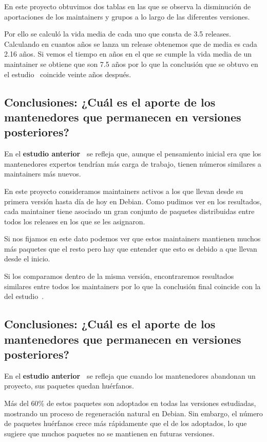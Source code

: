 \documentclass[a4paper, 12pt]{book}
\begin{document}
En este proyecto obtuvimos dos tablas en las que se observa la disminución de aportaciones de los maintainers y grupos a lo largo de las diferentes versiones.

Por ello se calculó la vida media de cada uno que consta de 3.5 releases. Calculando en cuantos años se lanza un release obtenemos que de media es cada 2.16 años. Si vemos el tiempo en años en el que se cumple la vida media de un maintainer se obtiene que son 7.5 años por lo que la conclusión que se obtuvo en el estudio~\cite{robles05:_debian} coincide veinte años después.

\subsection{Conclusiones: ¿Cuál es el aporte de los mantenedores que permanecen en versiones posteriores?}
\label{subsec:conclusion_4}

En el \textbf{estudio anterior~\cite{robles05:_debian}} se refleja que, aunque el pensamiento inicial era que los mantenedores expertos tendrían más carga de trabajo, tienen números similares a maintainers más nuevos.

En este proyecto consideramos maintainers activos a los que llevan desde su primera versión hasta día de hoy en Debian. Como pudimos ver en los resultados, cada maintainer tiene asociado un gran conjunto de paquetes distribuidas entre todos los releases en los que se les asignaron.

Si nos fijamos en este dato podemos ver que estos maintainers mantienen muchos más paquetes que el resto pero hay que entender que esto es debido a que llevan desde el inicio.

Si los comparamos dentro de la misma versión, encontraremos resultados similares entre todos los maintainers por lo que la conclusión final coincide con la del estudio~\cite{robles05:_debian}. 

\subsection{Conclusiones: ¿Cuál es el aporte de los mantenedores que permanecen en versiones posteriores?}
\label{subsec:conclusion_5}

En el \textbf{estudio anterior~\cite{robles05:_debian}} se refleja que cuando los mantenedores abandonan un proyecto, sus paquetes quedan huérfanos. 

Más del 60\% de estos paquetes son adoptados en todas las versiones estudiadas, mostrando un proceso de regeneración natural en Debian. Sin embargo, el número de paquetes huérfanos crece más rápidamente que el de los adoptados, lo que sugiere que muchos paquetes no se mantienen en futuras versiones. 
\end{document}
